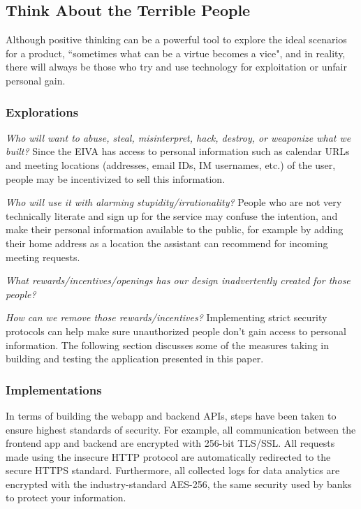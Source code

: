 \documentclass{article}
\begin{document}
\subsection{Think About the Terrible People}

Although positive thinking can be a powerful tool to explore the ideal scenarios for a product, ``sometimes what can be a virtue becomes a vice", and in reality, there will always be those who try and use technology for exploitation or unfair personal gain.

\subsubsection{Explorations}

\emph{Who will want to abuse, steal, misinterpret, hack, destroy, or weaponize what we built?} Since the EIVA has access to personal information such as calendar URLs and meeting locations (addresses, email IDs, IM usernames, etc.) of the user, people may be incentivized to sell this information.

\emph{Who will use it with alarming stupidity/irrationality?} People who are not very technically literate and sign up for the service may confuse the intention, and make their personal information available to the public, for example by adding their home address as a location the assistant can recommend for incoming meeting requests.

\emph{What rewards/incentives/openings has our design inadvertently created for those people?}

\emph{How can we \emph{remove} those rewards/incentives?} Implementing strict security protocols can help make sure unauthorized people don't gain access to personal information. The following section discusses some of the measures taking in building and testing the application presented in this paper.

\subsubsection{Implementations}

In terms of building the webapp and backend APIs, steps have been taken to ensure  highest standards of security. For example, all communication between the frontend app and backend are encrypted with 256-bit TLS/SSL. All requests made using the insecure HTTP protocol are automatically redirected to the secure HTTPS standard. Furthermore, all collected logs for data analytics are encrypted with the industry-standard AES-256, the same security used by banks to protect your information.
\end{document}
